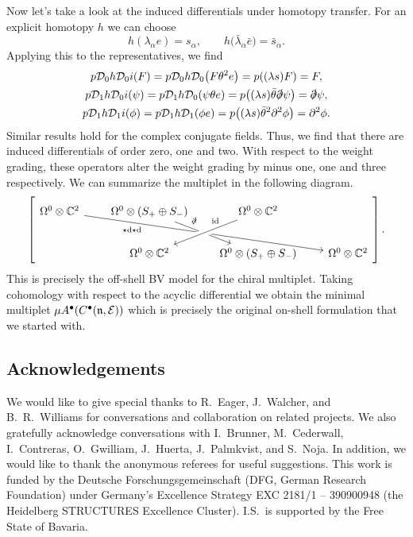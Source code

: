 \documentclass[pdftex]{sigma}
\numberwithin{equation}{section}
\def\cE{\mathcal E}\def\cF{\mathcal F}\def\cG{\mathcal G}\def\cH{\mathcal H}
\def\d{{\rm d}}
\begin{document}
Now let's take a look at the induced differentials under homotopy transfer. For an explicit homotopy $h$ we can choose
\begin{equation*}
h(\lambda_\alpha e) = s_\alpha, \qquad h \big(\bar{\lambda}_{\dot \alpha} \bar{e}\big) = \bar{s}_{\dot \alpha} .
\end{equation*}
Applying this to the representatives, we find
\begin{gather*}
p \mathcal D_0 h \mathcal D_0 i (F) = p \mathcal D_0 h \mathcal D_0 \big(F \theta^2 e\big) = p((\lambda s) F) = F, \\
p \mathcal D_1 h \mathcal D_0 i (\psi) = p \mathcal D_1 h \mathcal D_0 (\psi \theta e) = p\big((\lambda s) \bar{\theta} \slashed{\partial} \psi\big) = \slashed{\partial} \psi,\\
p \mathcal D_1 h \mathcal D_1 i (\phi) = p \mathcal D_1 h \mathcal D_1 (\phi e) = p\big((\lambda s) \bar{\theta}^2 \partial^2 \phi\big) = \partial^2 \phi .
\end{gather*}
Similar results hold for the complex conjugate fields. Thus, we find that there are induced differentials of order zero, one and two. With respect to the weight grading, these operators alter the weight grading by minus one, one and three respectively. We can summarize the multiplet in the following diagram.
\begin{equation*}
\left[
\begin{tikzcd}[row sep=0.7cm, column sep=0.7cm]
\Omega^0 \otimes \CC^2 \arrow[drrr, "\star \d \star \d" ' near start] & \Omega^0 \otimes (S_+ \oplus S_-) \arrow[dr, "\slashed{\partial}" , near start ] &\Omega^0 \otimes \CC^2 \arrow[dl , "\mathrm{id}" ' near start, crossing over]\\
& \Omega^0 \otimes \CC^2 & \Omega^0 \otimes (S_+ \oplus S_-) & \Omega^0 \otimes \CC^2
\end{tikzcd} \right].
\end{equation*}
This is precisely the off-shell BV model for the chiral multiplet. Taking cohomology with respect to the acyclic differential we obtain the minimal multiplet $\mu A^\bullet(C^\bullet(\fn,\cE))$ which is precisely the original on-shell formulation that we started with.

\subsection*{Acknowledgements}
We would like to give special thanks to R.~Eager, J.~Walcher, and B.~R.~Williams for conversations and collaboration on related projects. We also gratefully acknowledge conversations with I.~Brunner, M.~Cederwall, I.~Contreras, O.~Gwilliam, J.~Huerta, J.~Palmkvist, and S.~Noja. In addition, we would like to thank the anonymous referees for useful suggestions. This work is funded by the Deutsche Forschungsgemeinschaft (DFG, German Research Foundation) under Germany’s Excellence Strategy EXC 2181/1 -- 390900948 (the Heidelberg STRUCTURES Excellence Cluster). I.S.\ is supported by the Free State of Bavaria.
\end{document}
